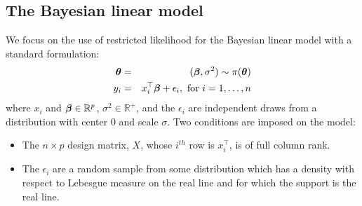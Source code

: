 \documentclass[12pt]{article}
\makeatletter
\def\bth{\mbox{\boldmath $\theta$}}
\def\bbeta{\mbox{\boldmath $\beta$}}
\newcommand{\green}[1]{{\color{green}#1}}
\newcommand{\labitem}[2]{%
\def\@itemlabel{\textbf{#1}{.}}
\item
\def\@currentlabel{#1}\label{#2}}
\makeatother
\begin{document}
\subsection{The Bayesian linear model}
We focus on the use of restricted likelihood for the Bayesian linear
model with a standard formulation: 
\begin{eqnarray}
\label{LinearModel}
\bth&=&(\bbeta,\sigma^2) \sim  \pi(\bth) 
\nonumber\\
y_i  & =  & x_i^\top \bbeta + \epsilon_i , \mbox{ for } i = 1, \ldots, n 
\end{eqnarray}
where $x_i$ and $\bbeta \in \mathbb{R}^p$, \green{$\sigma^2 \in \mathbb{R}^+$}, 
and the $\epsilon_i$ are independent 
draws from a distribution with center $0$ and scale $\sigma$.
Two conditions are imposed on the model:
\begin{itemize}
\labitem{C1}{fullRank} The $n \times p$ design matrix, $X$, whose $i^{th}$ row is $x_i^\top$, 
is of full column rank.  
\labitem{C2}{supReal} The $\epsilon_i$ are a random sample from some distribution which has a density with 
respect to Lebesgue measure on the real line and for which the support is the real line.  
\end{itemize}
\end{document}
